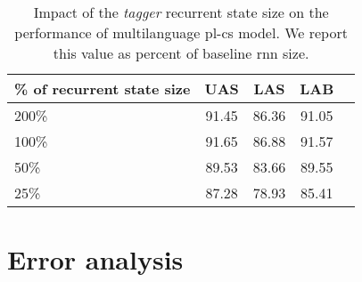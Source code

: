 \begin{table}[!htbp]
    \centering
    \begin{tabular}{l c c c c}
        \% of recurrent state size & UAS & LAS & LAB \\ \hline 
        200\% & 91.45 & 86.36& 91.05 \\
        100\% & 91.65 & 86.88 & 91.57\\
        50\% & 89.53 & 83.66 & 89.55 \\
        25\% & 87.28 & 78.93 & 85.41
    \end{tabular}
    \label{tab:birnn_multi_size}
    \caption{Impact of the \emph{tagger} recurrent state size on the performance
    of multilanguage pl-cs model.
    We report this value as percent of baseline rnn size.}
\end{table}

\section{Error analysis}
